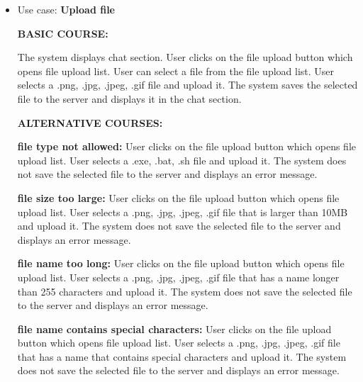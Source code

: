 \documentclass[]{VUMIFTemplateClass}
\begin{document}
\begin{itemize}
    \textbf{user has not selected any emojis:}
    User clicks on the emoji button which opens emoji list. User does not select any emojis from the emoji list. The system does not add any emojis to the message input field and does not display an error message.

    \item 
    Use case: \textbf{Upload file}

    \textbf{BASIC COURSE:}

    The system displays chat section. User clicks on the file upload button which opens file upload list. User can select a file from the file upload list. User selects a .png, .jpg, .jpeg, .gif file and upload it. The system saves the selected file to the server and displays it in the chat section.

    \textbf{ALTERNATIVE COURSES:}

    \textbf{file type not allowed:}
    User clicks on the file upload button which opens file upload list. User selects a .exe, .bat, .sh file and upload it. The system does not save the selected file to the server and displays an error message.

    \textbf{file size too large:}
    User clicks on the file upload button which opens file upload list. User selects a .png, .jpg, .jpeg, .gif file that is larger than 10MB and upload it. The system does not save the selected file to the server and displays an error message.

    \textbf{file name too long:}
    User clicks on the file upload button which opens file upload list. User selects a .png, .jpg, .jpeg, .gif file that has a name longer than 255 characters and upload it. The system does not save the selected file to the server and displays an error message.
    
    \textbf{file name contains special characters:}
    User clicks on the file upload button which opens file upload list. User selects a .png, .jpg, .jpeg, .gif file that has a name that contains special characters and upload it. The system does not save the selected file to the server and displays an error message.

\end{itemize}
\end{document}
